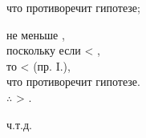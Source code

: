 \documentclass[a4paper, 10pt]{article}
\begin{document}
\begin{minipage}{0.59\textwidth}
\begin{center}
            что противоречит гипотезе; \\
            
            \vspace*{1em}

            \raisebox{-1.3em}{\orangeangle} не меньше \raisebox{-1.3em}{\blackangle}, \\

            поскольку если \raisebox{-1.3em}{\orangeangle} \Large{<} \raisebox{-1.3em}{\blackangle}, \\

            то \blacklineBC \Large{<} \orangelineEF (пр. I.), \\

            что противоречит гипотезе. \\

            $\therefore$ \raisebox{-1.3em}{\orangeangle} \Large{>} \raisebox{-1.3em}{\blackangle}. \\

        \end{center}

        \begin{flushright}

            ч.т.д.

        \end{flushright}
        
    \end{minipage}
    \hfill
\end{document}
